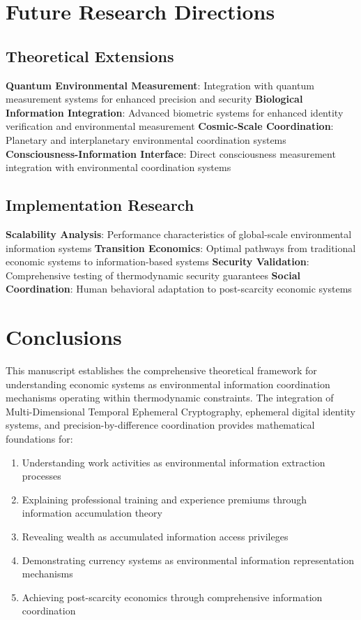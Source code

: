 \documentclass[12pt,a4paper]{article}
\begin{document}
\section{Future Research Directions}

\subsection{Theoretical Extensions}

\textbf{Quantum Environmental Measurement}: Integration with quantum measurement systems for enhanced precision and security
\textbf{Biological Information Integration}: Advanced biometric systems for enhanced identity verification and environmental measurement
\textbf{Cosmic-Scale Coordination}: Planetary and interplanetary environmental coordination systems
\textbf{Consciousness-Information Interface}: Direct consciousness measurement integration with environmental coordination systems

\subsection{Implementation Research}

\textbf{Scalability Analysis}: Performance characteristics of global-scale environmental information systems
\textbf{Transition Economics}: Optimal pathways from traditional economic systems to information-based systems
\textbf{Security Validation}: Comprehensive testing of thermodynamic security guarantees
\textbf{Social Coordination}: Human behavioral adaptation to post-scarcity economic systems

\section{Conclusions}

This manuscript establishes the comprehensive theoretical framework for understanding economic systems as environmental information coordination mechanisms operating within thermodynamic constraints. The integration of Multi-Dimensional Temporal Ephemeral Cryptography, ephemeral digital identity systems, and precision-by-difference coordination provides mathematical foundations for:

\begin{enumerate}
\item Understanding work activities as environmental information extraction processes
\item Explaining professional training and experience premiums through information accumulation theory
\item Revealing wealth as accumulated information access privileges
\item Demonstrating currency systems as environmental information representation mechanisms
\item Achieving post-scarcity economics through comprehensive information coordination
\end{enumerate}
\end{document}
